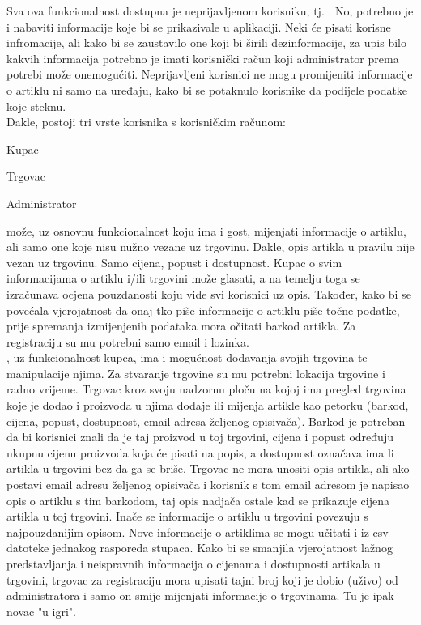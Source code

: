     Sva ova funkcionalnost dostupna je neprijavljenom korisniku, tj. . No, potrebno je i nabaviti informacije koje bi se prikazivale u aplikaciji. Neki će pisati korisne infromacije, ali kako bi se zaustavilo one koji bi širili dezinformacije, za upis bilo kakvih informacija potrebno je imati korisnički račun koji administrator prema potrebi može onemogućiti. Neprijavljeni korisnici ne mogu promijeniti informacije o artiklu ni samo na uređaju, kako bi se potaknulo korisnike da podijele podatke koje steknu. \\
    
    Dakle, postoji tri vrste korisnika s korisničkim računom:
    \begin{packed_item}
        \item Kupac
        \item Trgovac
        \item Administrator
    \end{packed_item}
    
     može, uz osnovnu funkcionalnost koju ima i gost, mijenjati informacije o artiklu, ali samo one koje nisu nužno vezane uz trgovinu. Dakle, opis artikla u pravilu nije vezan uz trgovinu. Samo cijena, popust i dostupnost. Kupac o svim informacijama o artiklu i/ili trgovini može glasati, a na temelju toga se izračunava ocjena pouzdanosti koju vide svi korisnici uz opis. Također, kako bi se povećala vjerojatnost da onaj tko piše informacije o artiklu piše točne podatke, prije spremanja izmijenjenih podataka mora očitati barkod artikla. Za registraciju su mu potrebni samo email i lozinka. \\
    
    , uz funkcionalnost kupca, ima i mogućnost dodavanja svojih trgovina te manipulacije njima. Za stvaranje trgovine su mu potrebni lokacija trgovine i radno vrijeme. Trgovac kroz svoju nadzornu ploču na kojoj ima pregled trgovina koje je dodao i proizvoda u njima dodaje ili mijenja artikle kao petorku (barkod, cijena, popust, dostupnost, email adresa željenog opisivača). Barkod je potreban da bi korisnici znali da je taj proizvod u toj trgovini, cijena i popust određuju ukupnu cijenu proizvoda koja će pisati na popis, a dostupnost označava ima li artikla u trgovini bez da ga se briše. Trgovac ne mora unositi opis artikla, ali ako postavi email adresu željenog opisivača i korisnik s tom email adresom je napisao opis o artiklu s tim barkodom, taj opis nadjača ostale kad se prikazuje cijena artikla u toj trgovini. Inače se informacije o artiklu u trgovini povezuju s najpouzdanijim opisom. Nove informacije o artiklima se mogu učitati i iz csv datoteke jednakog rasporeda stupaca. Kako bi se smanjila vjerojatnost lažnog predstavljanja i neispravnih informacija o cijenama i dostupnosti artikala u trgovini, trgovac za registraciju mora upisati tajni broj koji je dobio (uživo) od administratora i samo on smije mijenjati informacije o trgovinama. Tu je ipak novac "u igri". \\
    
